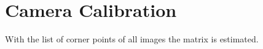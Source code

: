 \documentclass[twocolumn,10pt]{asme2ej}
\begin{document}

\section{Camera Calibration}
\noindent

With the list of corner points of all images the matrix is estimated.





\end{document}
